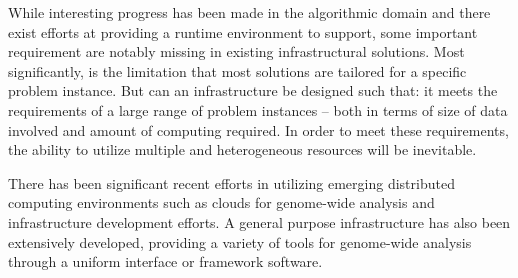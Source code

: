 \documentclass{sig-alternate}
\begin{document}



While interesting progress has been made in the algorithmic domain and
there exist efforts at providing a runtime environment to support,
some important requirement are notably missing in existing
infrastructural solutions. Most significantly, is the limitation that
most solutions are tailored for a specific problem instance. But can
an infrastructure be designed such that: it meets the requirements of
a large range of problem instances -- both in terms of size of data
involved and amount of computing required.  In order to meet these
requirements, the ability to utilize multiple and heterogeneous
resources will be inevitable.

There has been significant recent efforts in utilizing emerging
distributed computing environments such as clouds for genome-wide
analysis and infrastructure development
efforts\cite{taylor2010,cloudburst, cloudblast, langmead2009,
  langmead2010,gatk, halligan2009,luyf-2010}.
A general purpose infrastructure has also been extensively developed,
providing a variety of tools for genome-wide analysis through a
uniform interface or framework software\cite{galaxy}.


\end{document}
